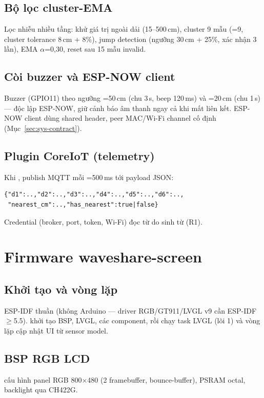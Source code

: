 \subsection{Bộ lọc cluster-EMA}
Lọc nhiễu nhiều tầng: khử giá trị ngoài dải (15--500\,cm), cluster 9 mẫu
(=9, cluster tolerance 8\,cm + 8\%), jump detection
(ngưỡng 30\,cm + 25\%, xác nhận 3 lần), EMA $\alpha$=0,30, reset sau 15 mẫu invalid.

\subsection{Còi buzzer và ESP-NOW client}
Buzzer (GPIO11) theo ngưỡng =50\,cm
(chu 3\,s, beep 120\,ms) và =20\,cm (chu 1\,s) —
độc lập ESP-NOW, giữ cảnh báo âm thanh ngay cả khi mất liên kết. ESP-NOW client dùng
shared header, peer MAC/Wi-Fi channel cố định (Mục~\ref{sec:sys-contract}).

\subsection{Plugin CoreIoT (telemetry)}
Khi , publish MQTT mỗi =500\,ms
tới  payload JSON:
\begin{verbatim}
{"d1":..,"d2":..,"d3":..,"d4":..,"d5":..,"d6":..,
 "nearest_cm":..,"has_nearest":true|false}
\end{verbatim}
Credential (broker, port, token, Wi-Fi) đọc từ  do
 sinh từ  (R1).

\section{Firmware waveshare-screen}
\label{sec:sys-screen}

\subsection{Khởi tạo và vòng lặp}
ESP-IDF thuần (không Arduino — driver RGB/GT911/LVGL v9 cần ESP-IDF $\geq$5.5). 
khởi tạo BSP, LVGL, các component, rồi chạy task LVGL (lõi 1) và vòng lặp cập nhật UI từ
sensor model.

\subsection{BSP RGB LCD}
 cấu hình panel RGB 800$\times$480 (2 framebuffer,
bounce-buffer), PSRAM octal, backlight qua CH422G.

